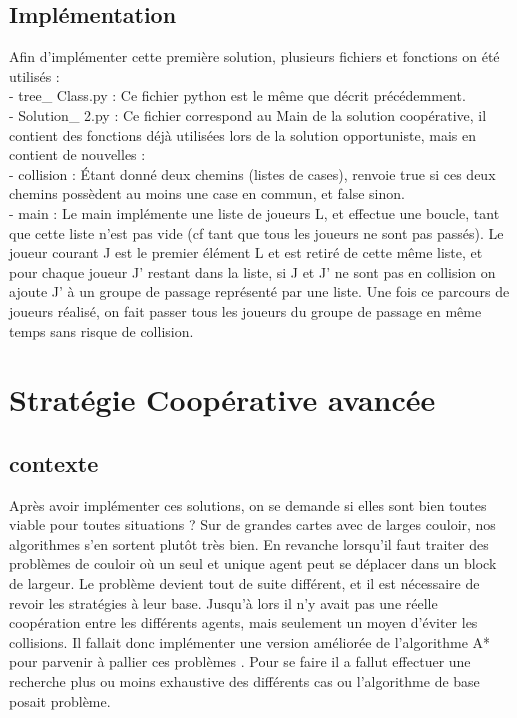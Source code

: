 \documentclass{article}
\begin{document}
\subsection{Implémentation}

Afin d'implémenter cette première solution, plusieurs fichiers et fonctions on été utilisés : \\ 

- tree\_ Class.py : Ce fichier python est le même que décrit précédemment.\\ 

- Solution\_ 2.py : Ce fichier correspond au Main de la solution coopérative, il contient des fonctions déjà utilisées lors de la solution opportuniste, mais en contient de nouvelles : \\ 

- collision : Étant donné deux chemins (listes de cases), renvoie true si ces deux chemins possèdent au moins une case en commun, et false sinon. \\ 
	
- main : Le main implémente une liste de joueurs L, et effectue une boucle, tant que cette liste n'est pas vide (cf tant que tous les joueurs ne sont pas passés). Le joueur courant J est le premier élément L et est retiré de cette même liste, et pour chaque joueur J' restant dans la liste, si J et J' ne sont pas en collision on ajoute J' à un groupe de passage représenté par une liste. Une fois ce parcours de joueurs réalisé, on fait passer tous les joueurs du groupe de passage en même temps sans risque de collision.\\
\newpage
\section{Stratégie Coopérative avancée}

\subsection{contexte}

Après avoir implémenter ces solutions, on se demande si elles sont bien toutes viable pour toutes situations ? Sur de grandes cartes avec de larges couloir, nos algorithmes s’en sortent plutôt très bien. En revanche lorsqu’il faut traiter des problèmes de couloir où un seul et unique agent peut se déplacer dans un block de largeur. Le problème devient tout de suite différent, et  il est nécessaire de revoir les stratégies à leur base. Jusqu'à lors il n’y avait pas une réelle coopération entre les différents agents, mais seulement un moyen d’éviter les collisions. Il fallait donc implémenter une version améliorée de l’algorithme A* pour parvenir à pallier ces problèmes . Pour se faire il a fallut effectuer une recherche plus ou moins exhaustive des différents cas ou l’algorithme de base posait problème.
\end{document}
